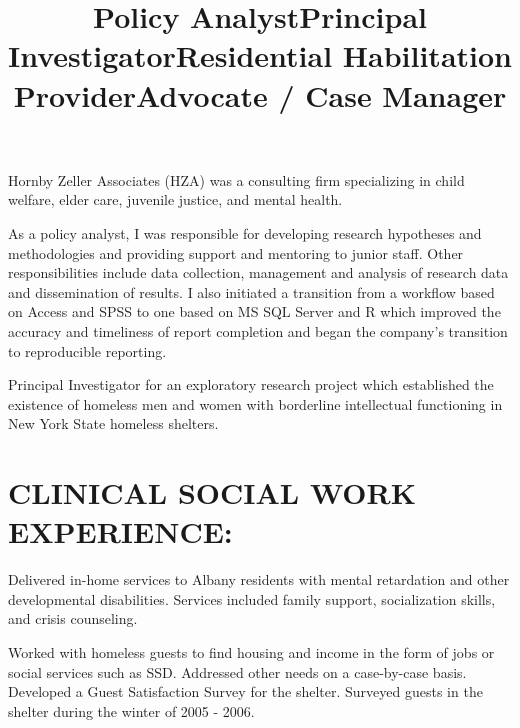 \documentclass[line, mm, 10pt]{res}
\begin{document}
\begin{resume}
  \title{Policy Analyst}
  \begin{position}
    Hornby Zeller Associates (HZA) was a consulting firm specializing in child
    welfare, elder care, juvenile justice, and mental health. 
    
    As a policy analyst, I was responsible for developing research hypotheses
    and methodologies and providing support and mentoring to junior staff. Other
    responsibilities include data collection, management and analysis of
    research data and dissemination of results. I also initiated a transition
    from a workflow based on Access and SPSS to one based on MS SQL Server and R
    which improved the accuracy and timeliness of report completion and began
    the company's transition to reproducible reporting.
  \end{position}

  \title{Principal Investigator}
  \begin{position}
    Principal Investigator for an exploratory research project which
    established the existence of homeless men and women with
    borderline intellectual functioning in New York State homeless
    shelters.
  \end{position}


  \section{CLINICAL SOCIAL WORK EXPERIENCE:}

  \title{Residential Habilitation Provider}
  \begin{position}
    Delivered in-home services to Albany residents with mental
    retardation and other developmental disabilities. Services included
    family support, socialization skills, and crisis counseling.
  \end{position}

  \title{Advocate / Case Manager}
  \begin{position}
    Worked with homeless guests to find housing and income in the form
    of jobs or social services such as SSD. Addressed other needs on a case-by-case
    basis. Developed a Guest Satisfaction Survey for the shelter. Surveyed
    guests in the shelter during the winter of 2005 - 2006.
  \end{position}


\end{resume}
\end{document}
